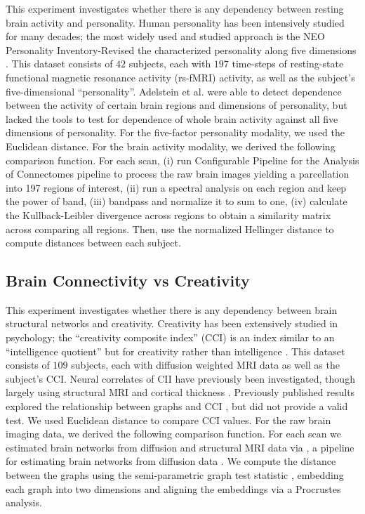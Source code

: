 \documentclass[11pt]{extarticle}
\begin{document}
This experiment investigates whether there is any dependency between resting brain activity and personality. Human personality has been intensively studied for many decades; the most widely used and studied approach is the NEO Personality Inventory-Revised the characterized personality along five dimensions \cite{Costa1992}.
%
This dataset consists of $42$ subjects, each with  $197$ time-steps of resting-state functional magnetic resonance activity (rs-fMRI) activity, as well as the subject's five-dimensional ``personality''. Adelstein et al. \cite{AdelsteinEtAl2011} were able to detect dependence between the activity of certain brain regions and dimensions of personality, but lacked the tools to test for dependence of whole brain activity against all five dimensions of personality.
%
For the five-factor personality modality, we  used the Euclidean distance. For the brain activity modality,
we derived the following comparison function. For each scan, (i) run Configurable Pipeline for the
 Analysis of Connectomes pipeline \cite{CPAC2015} to process the raw brain images yielding a parcellation into
197 regions of interest,
(ii) run a spectral analysis on each region and keep the power of band,
(iii) bandpass and normalize it to sum to one,
(iv) calculate the Kullback-Leibler divergence across regions to obtain a similarity matrix across comparing all regions.
Then, use the normalized Hellinger distance to compute distances between each subject.


\subsection{Brain Connectivity vs Creativity}
\label{app:creativity}

This experiment investigates whether there is any dependency between brain structural networks and creativity. Creativity has  been extensively studied in  psychology; the ``creativity composite index'' (CCI) is an index similar to an ``intelligence quotient'' but for creativity rather than intelligence \cite{Jung2009}.
%
This dataset consists of $109$ subjects, each with diffusion weighted MRI data as well as the subject's CCI.
Neural correlates of CII have previously been investigated, though largely using structural MRI and cortical thickness \cite{Jung2009}.  Previously published results explored the relationship between graphs and  CCI \cite{Koutra15a}, but did not provide a valid test.
%
We used Euclidean distance to compare CCI values.
For the raw brain imaging data, we derived the following comparison function.  For each scan we estimated brain networks from diffusion and structural MRI data via  \Migraine, a pipeline for estimating brain networks from diffusion data \cite{GrayRoncal2013}.
We compute the distance between the graphs using the semi-parametric graph test statistic \cite{Sussman2013,ShenVogelsteinPriebe2016,Tang2016}, embedding each graph into two dimensions and aligning the embeddings via a Procrustes analysis.
\end{document}

